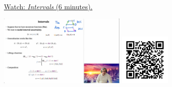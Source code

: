 
\begin{minipage}{10cm}
    \href{https://act4e-spring21.netlify.app/videos/spring2021-monads-a:intervals.html}{Watch: \emph{Intervals} (6 minutes).}
        
    \href{https://act4e-spring21.netlify.app/videos/spring2021-monads-a:intervals.html}{\includegraphics[height=3.5cm]{spring2021-monads-a:intervals/thumbnails.jpg}}
    \href{https://act4e-spring21.netlify.app/videos/spring2021-monads-a:intervals.html}{\includegraphics[height=2.5cm]{spring2021-monads-a:intervals/qrcode.png}}
\end{minipage}

